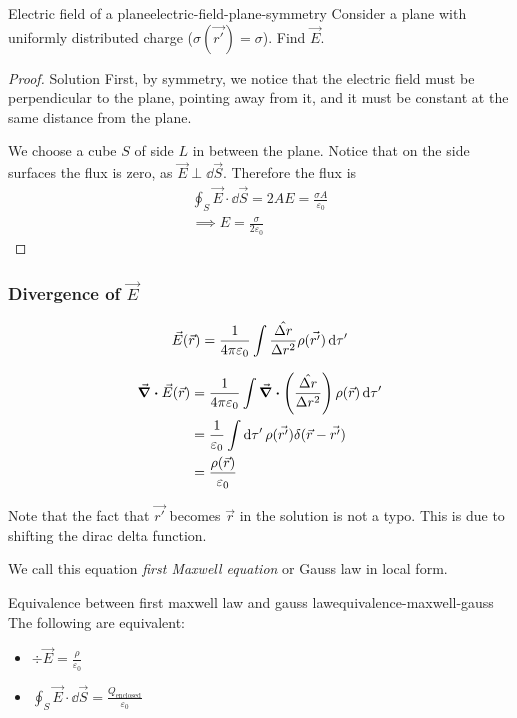 \documentclass[12pt]{extarticle}
\begin{document}
\begin{example}{Electric field of a plane}{electric-field-plane-symmetry}
	Consider a plane with uniformly distributed charge ($\sigma(\vec {r'}) = \sigma$).
	Find $\vec E$.
\end{example}

\begin{proof}{Solution}
	First, by symmetry, we notice that the electric field must be perpendicular to the plane, pointing away from it, and it must be constant at the same distance from the plane.

	We choose a cube $S$ of side $L$ in between the plane.
	Notice that on the side surfaces the flux is zero, as $\vec E \perp \dd{\vec S}$.
	Therefore the flux is
	\begin{gather}
		\oint_S \vec E \cdot \dd{\vec S} = 2 A E = \frac{\sigma A}{\varepsilon_0}\\
		\implies E = \frac{\sigma}{2 \varepsilon_0}
	\end{gather}

\end{proof}

\subsubsection{Divergence of \texorpdfstring{$\vec E$}{the electric field}}

\begin{equation}
	\vec E(\vec r) = \frac{1}{4 \pi \varepsilon_0} \int \frac{\hat{\Delta r}}{\Delta r^2} \rho(\vec{r'}) \dd{\tau'}
\end{equation}

\begin{align}
	\div \vec E(\vec r) & = \frac{1}{4 \pi \varepsilon_0} \int \div \left(\frac{\hat{\Delta r}}{\Delta r^2} \right) \rho(\vec r) \dd{\tau'} \\
	                    & = \frac{1}{\varepsilon_0} \int \dd{\tau'} \rho(\vec{r'}) \delta(\vec r - \vec{r'})                                \\
	                    & = \frac{\rho(\vec r)}{\varepsilon_0}
\end{align}

Note that the fact that $\vec {r'}$ becomes $\vec r$ in the solution is not a typo. This is due to shifting the dirac delta function.

We call this equation \emph{first Maxwell equation} or Gauss law in local form.

\begin{proposition}{Equivalence between first maxwell law and gauss law}{equivalence-maxwell-gauss}
	The following are equivalent:
	\begin{itemize}
		\item $\div \vec E = \frac{\rho}{\varepsilon_0}$
		\item $\oint_S \vec E \cdot \dd{\vec S} = \frac{Q_\text{enclosed}}{\varepsilon_0}$
	\end{itemize}
\end{proposition}
\end{document}
